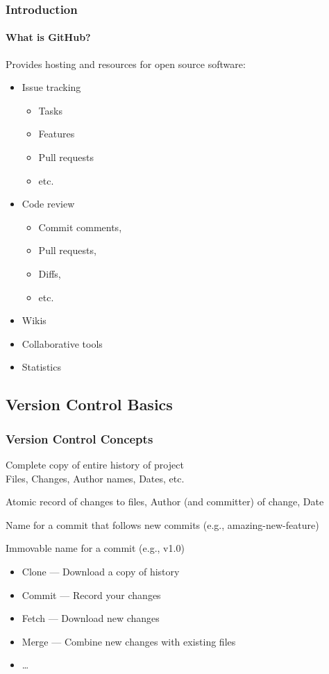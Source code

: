 \begin{frame}
 \frametitle{Introduction}
 \framesubtitle{What is GitHub?}

 Provides hosting and resources for open source software:
 \begin{itemize}
  \item Issue tracking
   \begin{itemize}
    \item Tasks
    \item Features
    \item Pull requests
    \item etc.
   \end{itemize}
  \item Code review
   \begin{itemize}
    \item Commit comments,
    \item Pull requests,
    \item Diffs,
    \item etc.
   \end{itemize}
  \item Wikis
  \item Collaborative tools
  \item Statistics
 \end{itemize}
\end{frame}

\subsection{Version Control Basics}

\begin{frame}
 \frametitle{Version Control Concepts}

 \begin{description}[Operations]
  \item[Repository] Complete copy of entire history of project\\
                    Files, Changes, Author names, Dates, etc.
  \item[Commit] Atomic record of changes to files, Author (and committer) of
                change, Date
  \item[Branch] Name for a commit that follows new commits (e.g.,
                amazing-new-feature)
  \item[Tag] Immovable name for a commit (e.g., v1.0)
  \item[Operations]
   \begin{itemize}
    \item Clone --- Download a copy of history
    \item Commit --- Record your changes
    \item Fetch --- Download new changes
    \item Merge --- Combine new changes with existing files
    \item \ldots
   \end{itemize}
 \end{description}
\end{frame}

